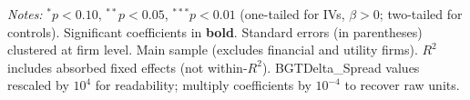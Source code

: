\begin{landscape}
\begin{table}[H]
\begin{minipage}{\linewidth}
\vspace{2pt}\scriptsize
\textit{Notes:} $^{*}p<0.10$, $^{**}p<0.05$, $^{***}p<0.01$ (one-tailed for IVs, $\beta > 0$; two-tailed for controls).
 Significant coefficients in \textbf{bold}.
 Standard errors (in parentheses) clustered at firm level.
 Main sample (excludes financial and utility firms).
 $R^2$ includes absorbed fixed effects (not within-$R^2$).
 BGTDelta\_Spread values rescaled by $10^4$ for readability; multiply coefficients by $10^{-4}$ to recover raw units.
\end{minipage}
\end{table}
\end{landscape}